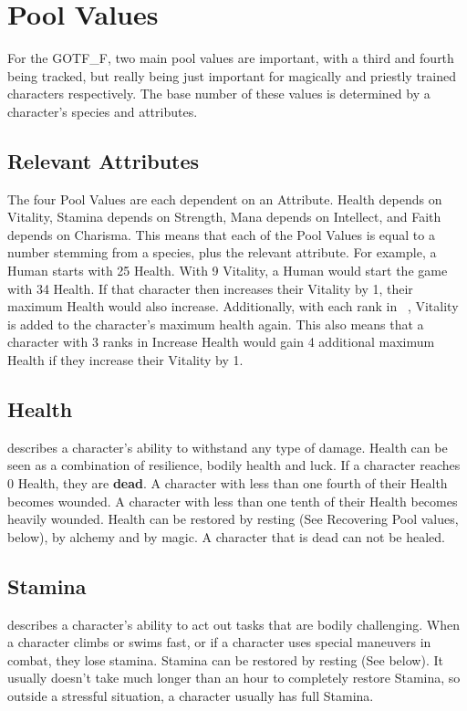 \section{Pool Values}\label{sec:pools}
For the GOTF\_F, two main pool values are important, with a third and fourth being tracked, but really being just important for magically and priestly trained characters respectively.
The base number of these values is determined by a character's species and attributes.\\

\subsection{Relevant Attributes}\label{subsec:relevantAttributesPools}
The four Pool Values are each dependent on an Attribute.
Health depends on Vitality, Stamina depends on Strength, Mana depends on Intellect, and Faith depends on Charisma.
This means that each of the Pool Values is equal to a number stemming from a species, plus the relevant attribute.
For example, a Human starts with 25 Health.
With 9 Vitality, a Human would start the game with 34 Health.
If that character then increases their Vitality by 1, their maximum Health would also increase.
Additionally, with each rank in ~, Vitality is added to the character's maximum health again.
This also means that a character with 3 ranks in Increase Health would gain 4 additional maximum Health if they increase their Vitality by 1.

\subsection{Health}\label{pool:health} describes a character's ability to withstand any type of damage.
Health can be seen as a combination of resilience, bodily health and luck.
If a character reaches 0 Health, they are \textbf{dead}.
A character with less than one fourth of their Health becomes wounded. %
A character with less than one tenth of their Health becomes heavily wounded.%
Health can be restored by resting (See Recovering Pool values, below), by alchemy and by magic.
A character that is dead can not be healed.

\subsection{Stamina}\label{pool:stamina} describes a character's ability to act out tasks that are bodily challenging.
When a character climbs or swims fast, or if a character uses special maneuvers in combat, they lose stamina.
Stamina can be restored by resting (See below).
It usually doesn't take much longer than an hour to completely restore Stamina, so outside a stressful situation, a character usually has full Stamina.

